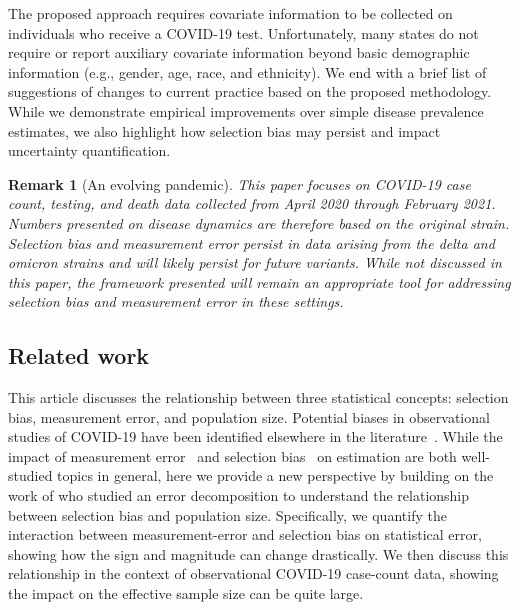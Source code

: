 \documentclass[11pt]{amsart}
\numberwithin{equation}{section}
\theoremstyle{plain}
\newtheorem{remark}{Remark}
\begin{document}
The proposed approach requires covariate information to be collected on individuals who receive a COVID-19 test.  Unfortunately, many states do not require or report auxiliary covariate information beyond basic demographic information (e.g., gender, age, race, and ethnicity).  We end with a brief list of suggestions of changes to current practice based on the proposed methodology. While we demonstrate empirical improvements over simple disease prevalence estimates, we also highlight how selection bias may persist and impact uncertainty quantification.

\begin{remark}[An evolving pandemic]
This paper focuses on COVID-19 case count, testing, and death data collected from April 2020 through February 2021.  Numbers presented on disease dynamics are therefore based on the original strain.  Selection bias and measurement error persist in data arising from the delta and omicron strains and will likely persist for future variants. While not discussed in this paper, the framework presented will remain an appropriate tool for addressing selection bias and measurement error in these settings.
\end{remark}


\subsection{Related work}

This article discusses the relationship between three statistical concepts: selection bias, measurement error, and population size.  Potential biases in observational studies of COVID-19 have been identified elsewhere in the literature~\citep{Kahn2021,Accorsi2020}.  While the impact of measurement error~\citep{Smeden2019} and selection bias~\citep{Keiding2016} on estimation are both well-studied topics in general, here we provide a new perspective by building on the work of \cite{Meng2018} who studied an error decomposition to understand the relationship between selection bias and population size.  Specifically, we quantify the interaction between measurement-error and selection bias on statistical error, showing how the sign and magnitude can change drastically.  We then discuss this relationship in the context of observational COVID-19 case-count data, showing the impact on the effective sample size can be quite large.
\end{document}
